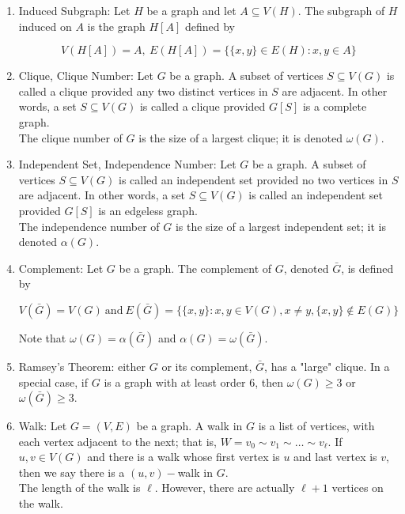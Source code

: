 \documentclass{article}
\begin{document}
\begin{enumerate}
		\item Induced Subgraph: Let $H$ be a graph and let $A\subseteq V(H)$.
		The subgraph of $H$ induced on $A$ is the graph $H[A]$ defined by
		
		\[V(H[A])=A, \: E(H[A])=\{\{x,y\}\in E(H): x,y\in A\}\]
		
		\item Clique, Clique Number: Let $G$ be a graph.
		A subset of vertices $S\subseteq V(G)$ is called a clique provided any two distinct vertices in $S$ are adjacent.
		In other words, a set $S\subseteq V(G)$ is called a clique provided $G[S]$ is a complete graph.\\
		
		The clique number of $G$ is the size of a largest clique;
		it is denoted $\omega (G)$.
		
		\item Independent Set, Independence Number: Let $G$ be a graph.
		A subset of vertices $S\subseteq V(G)$ is called an independent set provided no two vertices in $S$ are adjacent.
		In other words, a set $S\subseteq V(G)$ is called an independent set provided $G[S]$ is an edgeless graph.\\
		
		The independence number of $G$ is the size of a largest independent set;
		it is denoted $\alpha (G)$.
		
		\item Complement: Let $G$ be a graph.
		The complement of $G$, denoted $\bar G$, is defined by
		
		\[V(\bar G)=V(G)\: \text{and}\: E(\bar G)=\{\{x,y\}: x,y \in V(G), x\neq y, \{x,y\}\not\in E(G)\}\]
		
		Note that $\omega(G)=\alpha(\bar G)$ and $\alpha(G)=\omega(\bar G)$.
		
		\item Ramsey's Theorem: either $G$ or its complement, $\bar G$, has a "large" clique.
		In a special case, if $G$ is a graph with at least order $6$, then $\omega(G)\geq 3$ or $\omega(\bar G)\geq 3$.
		
		\item Walk: Let $G=(V,E)$ be a graph.
		A walk in $G$ is a list of vertices, with each vertex adjacent to the next;
		that is, $W=v_0\sim v_1\sim\dots\sim v_\ell$.
		If $u,v\in V(G)$ and there is a walk whose first vertex is $u$ and last vertex is $v$, then we say there is a $(u,v)-$walk in $G$.\\
		
		The length of the walk is $\ell$.
		However, there are actually $\ell +1$ vertices on the walk.
		

\end{enumerate}
\end{document}
